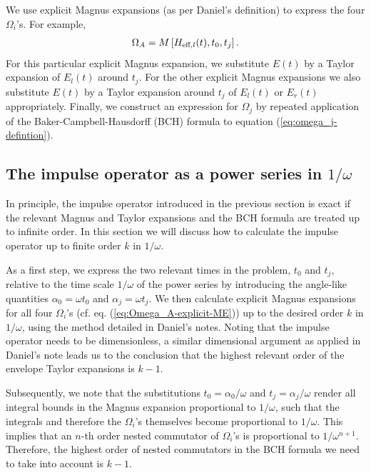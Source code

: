 We use explicit Magnus expansions (as per Daniel's definition) to express the four $\Omega_i$'s. For example,
\begin{align}
	\Omega_A = M\left[H_{\text{eff},l}(t), t_0, t_j\right].
	\label{eq:Omega_A-explicit-ME}
\end{align}
For this particular explicit Magnus expansion, we substitute $E(t)$ by a Taylor expansion of $E_l(t)$ around $t_j$. For the other explicit Magnus expansions we also substitute $E(t)$ by a Taylor expansion around $t_j$ of $E_l(t)$ or $E_r(t)$ appropriately. Finally, we construct an expression for $\Omega_j$ by repeated application of the Baker-Campbell-Hausdorff (BCH) formula to equation (\ref{eq:omega_j-defintion}).

\subsection{The impulse operator as a power series in $1/\omega$}
In principle, the impulse operator introduced in the previous section is exact if the relevant Magnus and Taylor expansions and the BCH formula are treated up to infinite order. In this section we will discuss how to calculate the impulse operator up to finite order $k$ in $1/\omega$. 

As a first step, we express the two relevant times in the problem, $t_0$ and $t_j$, relative to the time scale $1/\omega$ of the power series by introducing the angle-like quantities $\alpha_0 = \omega t_0$ and $\alpha_j = \omega t_j$. We then calculate explicit Magnus expansions for all four $\Omega_i$'s (cf. eq. (\ref{eq:Omega_A-explicit-ME})) up to the desired order $k$ in $1/\omega$, using the method detailed in Daniel's notes. Noting that the impulse operator needs to be dimensionless, a similar dimensional argument as applied in Daniel's note leads us to the conclusion that the highest relevant order of the envelope Taylor expansions is $k-1$.

Subsequently, we note that the substitutions $t_0 = \alpha_0/\omega$ and $t_j = \alpha_j/\omega$ render all integral bounds in the Magnus expansion proportional to $1/\omega$, such that the integrals and therefore the $\Omega_i$'s themselves become proportional to $1/\omega$. This implies that an $n$-th order nested commutator of $\Omega_i$'s is proportional to $1/\omega^{n+1}$. Therefore, the highest order of nested commutators in the BCH formula we need to take into account is $k-1$.

